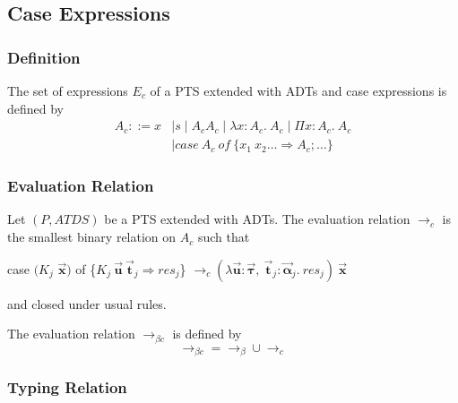 \documentclass[oneside,a4paper]{article}
\numberwithin{equation}{section}
\begin{document}
\subsection{Case Expressions}

\subsubsection{Definition}

The set of expressions $E_{c}$ of a PTS extended with ADTs and case
expressions is defined by
\begin{align*}
  A_{c} ::= x &\mid s \mid A_{c}A_{c} \mid \lambda x:A_{c}.\ A_{c} \mid \Pi x:A_{c}.\ A_{c}\\
              &\mid case\ A_{c}\ of\ \{x_{1}\ x_{2} \dots \Rightarrow
                A_{c}; \dots\}
\end{align*}

\subsubsection{Evaluation Relation}

Let $(P, ATDS)$ be a PTS extended with ADTs. The evaluation relation
$\rightarrow_{c}$ is the smallest binary relation on $A_{c}$ such that
\begin{center}
  case $(K_{j}$ $\vec{\mathbf{x}})$ of
  \{$K_{j}\ \vec{\mathbf{u}}\ \vec{\mathbf{t}}_j \Rightarrow
  res_{j}$\}
  $\rightarrow_{c} (\lambda \vec{\mathbf{u}}:\vec{\mathbf{\tau}},\
  \vec{\mathbf{t}}_j:\vec{\mathbf{\alpha}}_{j}.\ res_{j})\ \vec{\mathbf{x}}$
\end{center}
and closed under usual rules.

The evaluation relation $\rightarrow_{\beta c}$ is defined by
\[
\rightarrow_{\beta c} = \rightarrow_{\beta} \cup \rightarrow_{c}
\]

\subsubsection{Typing Relation}
\end{document}
